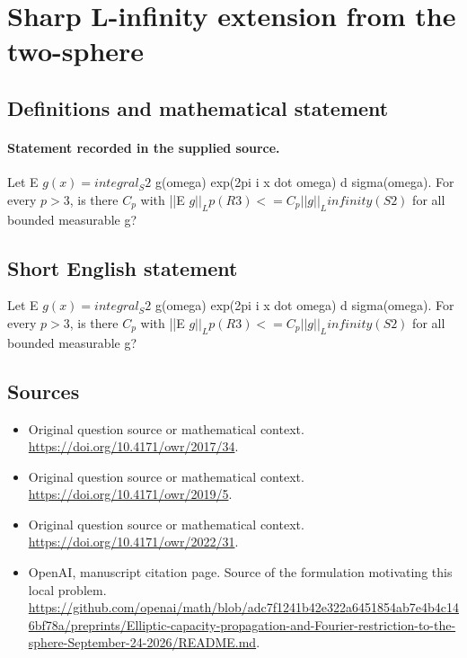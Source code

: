 \documentclass[11pt]{article}
\begin{document}
\section*{Sharp L-infinity extension from the two-sphere}\label{statement}
\subsection{Definitions and mathematical statement}
\paragraph{Statement recorded in the supplied source.}
Let E $g(x)=integral_S2$ g(omega) exp(2pi i x dot omega) d sigma(omega). For every $p>3$, is there $C_p$ with ||E $g||_Lp(R3)<=C_p||g||_Linfinity(S2)$ for all bounded measurable g?
\subsection{Short English statement}
Let E $g(x)=integral_S2$ g(omega) exp(2pi i x dot omega) d sigma(omega). For every $p>3$, is there $C_p$ with ||E $g||_Lp(R3)<=C_p||g||_Linfinity(S2)$ for all bounded measurable g?
\subsection{Sources}
\begin{itemize}
\item[S1] Original question source or mathematical context.
\url{https://doi.org/10.4171/owr/2017/34}.
\item[S2] Original question source or mathematical context.
\url{https://doi.org/10.4171/owr/2019/5}.
\item[S3] Original question source or mathematical context.
\url{https://doi.org/10.4171/owr/2022/31}.
\item[S4] OpenAI, manuscript citation page. Source of the formulation motivating this local problem.
\url{https://github.com/openai/math/blob/adc7f1241b42e322a6451854ab7e4b4c146bf78a/preprints/Elliptic-capacity-propagation-and-Fourier-restriction-to-the-sphere-September-24-2026/README.md}.
\end{itemize}
\end{document}
